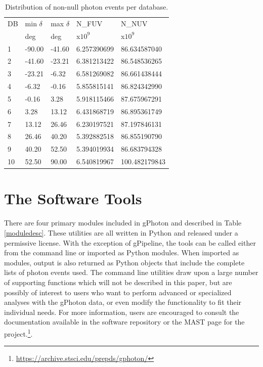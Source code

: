 \documentclass[preprint]{aastex}
\begin{document}
\begin{table}[h]
\begin{tabularx}{0.55\textwidth}{lllll}
\hline\hline
DB & min $\delta$ & max $\delta$ & N\_FUV & N\_NUV\\
   & deg          & deg          & x$10^9$ & x$10^9$\\
\hline
1 & -90.00 & -41.60 &   6.257390699 &  86.634587040\\
2 & -41.60 & -23.21 &   6.381213422 &  86.548536265\\
3 & -23.21 &  -6.32 &   6.581269082 &  86.661438444\\
4 &  -6.32 &  -0.16 &   5.855815141 &  86.824342990\\
5 &  -0.16 &   3.28 &   5.918115466 &  87.675967291\\
6 &   3.28 &  13.12 &   6.431868719 &  86.895361749\\
7 &  13.12 &  26.46 &   6.230197521 &  87.197846131\\
8 &  26.46 &  40.20 &   5.392882518 &  86.855190790\\
9 &  40.20 &  52.50 &   5.394019934 &  86.683794328\\
10 &  52.50 &  90.00 &   6.540819967 & 100.482179843\\
\hline
\end{tabularx}
\caption{Distribution of non-null photon events per database.\label{dbcounts}}
\end{table}

\section{The Software Tools}
\label{softwaretools}
There are four primary modules included in gPhoton and described in Table \ref{moduledesc}. These utilities are all written in Python and released under a permissive license. With the exception of gPipeline, the tools can be called either from the command line or imported as Python modules. When imported as modules, output is also returned as Python objects that include the complete lists of photon events used. The command line utilities draw upon a large number of supporting functions which will not be described in this paper, but are possibly of interest to users who want to perform advanced or specialized analyses with the gPhoton data, or even modify the functionality to fit their individual needs. For more information, users are encouraged to consult the documentation available in the software repository or the MAST page for the project.\footnote{\url{https://archive.stsci.edu/prepds/gphoton/}}.
\end{document}
